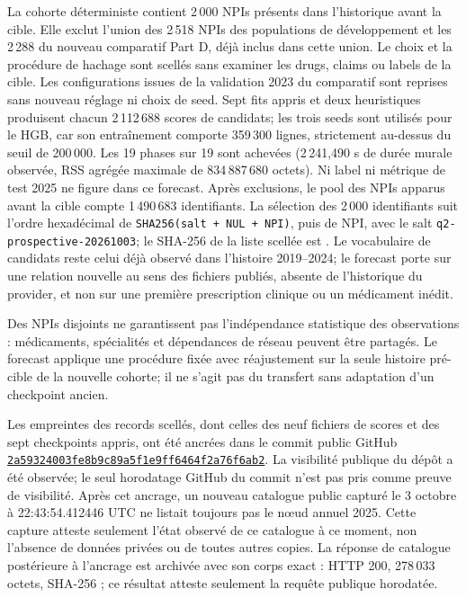 La cohorte déterministe contient 2\,000 NPIs présents dans l'historique avant la cible. Elle exclut l'union des 2\,518 NPIs des populations de développement et les 2\,288 du nouveau comparatif Part D, déjà inclus dans cette union. Le choix et la procédure de hachage sont scellés sans examiner les drugs, claims ou labels de la cible. Les configurations issues de la validation 2023 du comparatif sont reprises sans nouveau réglage ni choix de seed. Sept fits appris et deux heuristiques produisent chacun 2\,112\,688 scores de candidats; les trois seeds sont utilisés pour le HGB, car son entraînement comporte 359\,300 lignes, strictement au-dessus du seuil de 200\,000. Les 19 phases sur 19 sont achevées (2\,241{,}490 s de durée murale observée, RSS agrégée maximale de 834\,887\,680 octets). Ni label ni métrique de test 2025 ne figure dans ce forecast.
Après exclusions, le pool des NPIs apparus avant la cible compte 1\,490\,683 identifiants.
La sélection des 2\,000 identifiants suit l'ordre hexadécimal de \texttt{SHA256(salt + NUL + NPI)}, puis de NPI, avec le salt \texttt{q2-prospective-20261003}; le SHA-256 de la liste scellée est .
Le vocabulaire de candidats reste celui déjà observé dans l'histoire 2019--2024; le forecast porte sur une relation nouvelle au sens des fichiers publiés, absente de l'historique du provider, et non sur une première prescription clinique ou un médicament inédit.

Des NPIs disjoints ne garantissent pas l'indépendance statistique des observations : médicaments, spécialités et dépendances de réseau peuvent être partagés. Le forecast applique une procédure fixée avec réajustement sur la seule histoire pré-cible de la nouvelle cohorte; il ne s'agit pas du transfert sans adaptation d'un checkpoint ancien.

Les empreintes des records scellés, dont celles des neuf fichiers de scores et des sept checkpoints appris, ont été ancrées dans le commit public GitHub \href{https://github.com/carabistouflette/HealthGraphBench/commit/2a59324003fe8b9c89a5f1e9ff6464f2a76f6ab2}{\nolinkurl{2a59324003fe8b9c89a5f1e9ff6464f2a76f6ab2}}. La visibilité publique du dépôt a été observée; le seul horodatage GitHub du commit n'est pas pris comme preuve de visibilité. Après cet ancrage, un nouveau catalogue public capturé le 3 octobre à 22:43:54.412446 UTC ne listait toujours pas le nœud annuel 2025. Cette capture atteste seulement l'état observé de ce catalogue à ce moment, non l'absence de données privées ou de toutes autres copies.
La réponse de catalogue postérieure à l'ancrage est archivée avec son corps exact : HTTP 200, 278\,033 octets, SHA-256 ; ce résultat atteste seulement la requête publique horodatée.

